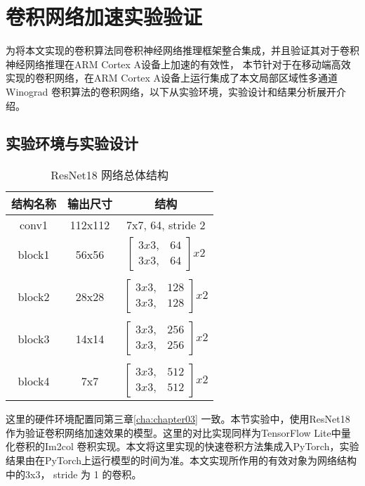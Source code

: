 \section{卷积网络加速实验验证}

为将本文实现的卷积算法同卷积神经网络推理框架整合集成，并且验证其对于卷积神经网络推理在ARM Cortex A设备上加速的有效性， 本节针对于在移动端高效实现的卷积网络，在ARM Cortex A设备上运行集成了本文局部区域性多通道Winograd 卷积算法的卷积网络，以下从实验环境，实验设计和结果分析展开介绍。

\subsection{实验环境与实验设计}
\begin{table}[]
  \centering
  \caption{ResNet18 网络总体结构}
  \begin{tabular}{ccc}
    \toprule
    结构名称 & 输出尺寸 & 结构 \\
    \midrule
    conv1 & 112x112 & 7x7, 64, stride 2 \\
    block1 & 56x56 & $ \begin{bmatrix} 3x3, & 64 \\  3x3, & 64 \end{bmatrix} x 2 $ \\ 
    \\
    block2 & 28x28 & $ \begin{bmatrix} 3x3, & 128 \\  3x3, & 128 \end{bmatrix} x 2 $ \\
    \\
    block3 & 14x14 & $ \begin{bmatrix} 3x3, & 256 \\  3x3, & 256 \end{bmatrix} x 2 $ \\
    \\
    block4 & 7x7 & $ \begin{bmatrix} 3x3, & 512 \\  3x3, & 512 \end{bmatrix} x 2 $ \\
    \bottomrule
  \end{tabular}
  \label{tbl:resnet_arch}
\end{table}


这里的硬件环境配置同第三章\ref{cha:chapter03} 一致。本节实验中，使用ResNet18 作为验证卷积网络加速效果的模型。这里的对比实现同样为TensorFlow Lite中量化卷积的Im2col 卷积实现。本文将这里实现的快速卷积方法集成入PyTorch，实验结果由在PyTorch上运行模型的时间为准。本文实现所作用的有效对象为网络结构中的3x3， stride 为 1 的卷积。

